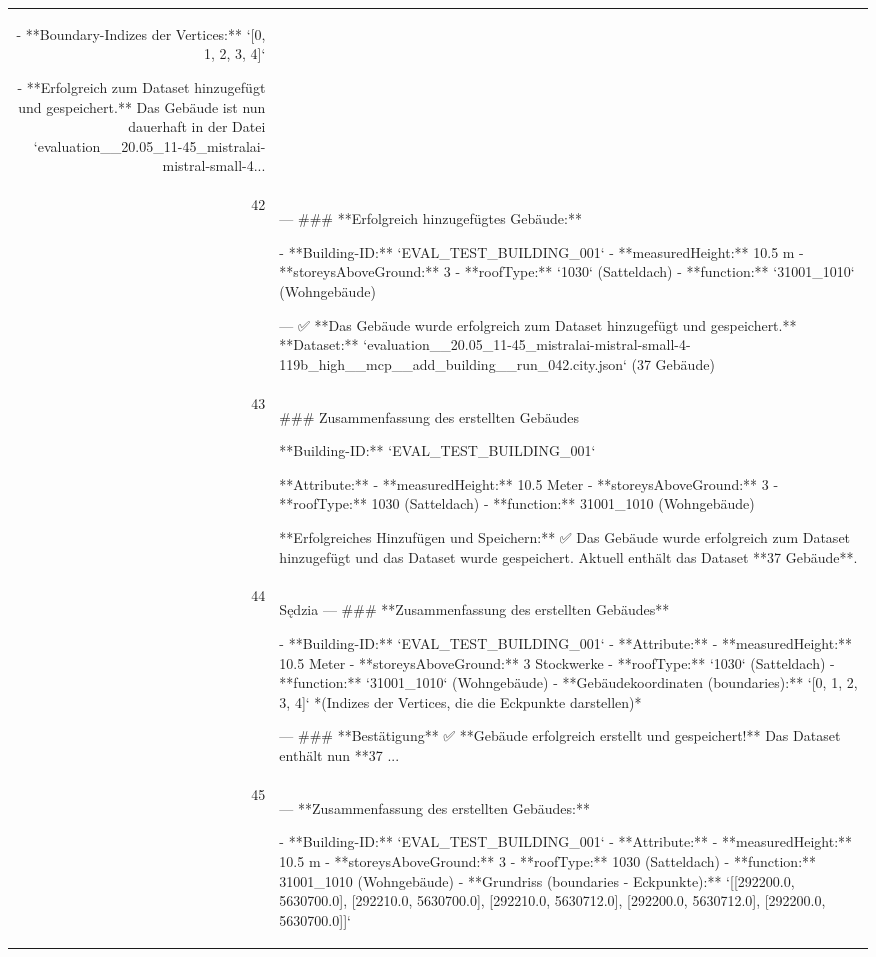 \documentclass[a4paper,11pt]{article}
\begin{document}
\begin{table}[ht]
\begin{tabular}{r p{12cm}}
- **Boundary-Indizes der Vertices:**
  `[0, 1, 2, 3, 4]`

- **Erfolgreich zum Dataset hinzugefügt und gespeichert.**
  Das Gebäude ist nun dauerhaft in der Datei `evaluation\_\_20.05\_11-45\_mistralai-mistral-small-4... \\
42 & ---
\#\#\# **Erfolgreich hinzugefügtes Gebäude:**

- **Building-ID:** `EVAL\_TEST\_BUILDING\_001`
- **measuredHeight:** 10.5 m
- **storeysAboveGround:** 3
- **roofType:** `1030` (Satteldach)
- **function:** `31001\_1010` (Wohngebäude)

---
✅ **Das Gebäude wurde erfolgreich zum Dataset hinzugefügt und gespeichert.**
**Dataset:** `evaluation\_\_20.05\_11-45\_mistralai-mistral-small-4-119b\_high\_\_mcp\_\_add\_building\_\_run\_042.city.json` (37 Gebäude) \\
43 & \#\#\# Zusammenfassung des erstellten Gebäudes

**Building-ID:** `EVAL\_TEST\_BUILDING\_001`

**Attribute:**
- **measuredHeight:** 10.5 Meter
- **storeysAboveGround:** 3
- **roofType:** 1030 (Satteldach)
- **function:** 31001\_1010 (Wohngebäude)

**Erfolgreiches Hinzufügen und Speichern:**
✅ Das Gebäude wurde erfolgreich zum Dataset hinzugefügt und das Dataset wurde gespeichert. Aktuell enthält das Dataset **37 Gebäude**. \\
44 & Sędzia
---
\#\#\# **Zusammenfassung des erstellten Gebäudes**

- **Building-ID:** `EVAL\_TEST\_BUILDING\_001`
- **Attribute:**
  - **measuredHeight:** 10.5 Meter
  - **storeysAboveGround:** 3 Stockwerke
  - **roofType:** `1030` (Satteldach)
  - **function:** `31001\_1010` (Wohngebäude)
- **Gebäudekoordinaten (boundaries):** `[0, 1, 2, 3, 4]`
  *(Indizes der Vertices, die die Eckpunkte darstellen)*

---
\#\#\# **Bestätigung**
✅ **Gebäude erfolgreich erstellt und gespeichert!**
Das Dataset enthält nun **37 ... \\
45 & ---
**Zusammenfassung des erstellten Gebäudes:**

- **Building-ID:** `EVAL\_TEST\_BUILDING\_001`
- **Attribute:**
  - **measuredHeight:** 10.5 m
  - **storeysAboveGround:** 3
  - **roofType:** 1030 (Satteldach)
  - **function:** 31001\_1010 (Wohngebäude)
- **Grundriss (boundaries - Eckpunkte):**
  `[[292200.0, 5630700.0], [292210.0, 5630700.0], [292210.0, 5630712.0], [292200.0, 5630712.0], [292200.0, 5630700.0]]`


\end{tabular}
\end{table}
\end{document}

